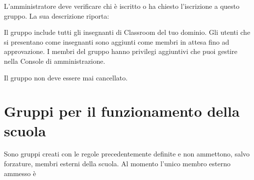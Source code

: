 L'amministratore deve verificare chi è iscritto o ha chiesto l'iscrizione a questo gruppo. La sua descrizione riporta:

	Il gruppo include tutti gli insegnanti di Classroom del tuo dominio. Gli utenti che si presentano come insegnanti sono aggiunti come membri in attesa fino ad approvazione. I membri del gruppo hanno privilegi aggiuntivi che puoi gestire nella Console di amministrazione.

Il gruppo non deve essere mai cancellato.
\section{Gruppi per il funzionamento della scuola }
Sono gruppi creati con le regole precedentemente definite e non ammettono, salvo forzature, membri esterni della scuola. Al momento l'unico membro esterno ammesso è 
